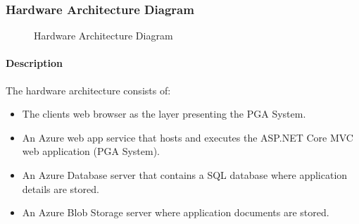 \documentclass[11pt]{article}
\begin{document}
\subsubsection{Hardware Architecture Diagram}
\begin{figure}[H]
	\caption{Hardware Architecture Diagram}
\end{figure}
\paragraph{Description}\hfil \newline

The hardware architecture consists of:

\begin{itemize}
\item The clients web browser as the layer presenting the PGA System.
\item An Azure web app service that hosts and executes the ASP.NET Core MVC web application (PGA System).
\item An Azure Database server that contains a SQL database where application details are stored. 
\item An Azure Blob Storage server where application documents are stored.

\end{itemize}
\end{document}
